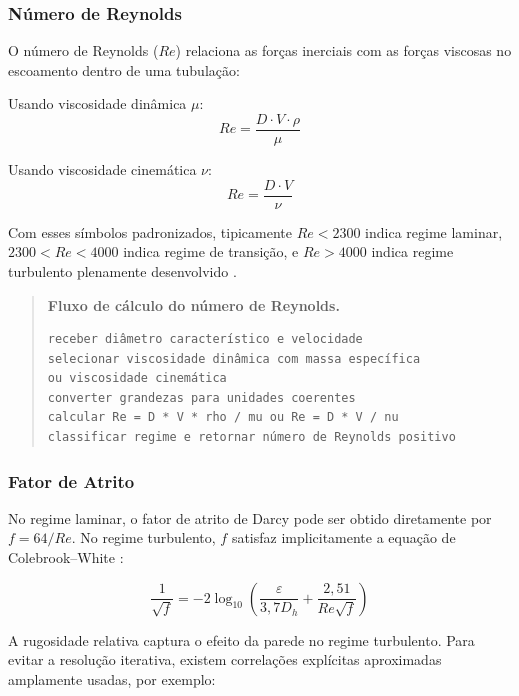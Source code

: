 \subsubsection{Número de Reynolds}

O número de Reynolds ($Re$) relaciona as forças inerciais com as forças viscosas no escoamento dentro de uma tubulação:

Usando viscosidade dinâmica $\mu$:
\begin{equation}
Re = \frac{D \cdot V \cdot \rho}{\mu}
\label{eq:reynolds_din}
\end{equation}

Usando viscosidade cinemática $\nu$:
\begin{equation}
Re = \frac{D \cdot V}{\nu}
\label{eq:reynolds_cin}
\end{equation}

Com esses símbolos padronizados, tipicamente $Re < 2300$ indica regime laminar, $2300 < Re < 4000$ indica regime de transição, e $Re > 4000$ indica regime turbulento plenamente desenvolvido \cite{white2018}.

\begin{quote}
\small
\textbf{Fluxo de cálculo do número de Reynolds.}
\begin{verbatim}
receber diâmetro característico e velocidade
selecionar viscosidade dinâmica com massa específica
ou viscosidade cinemática
converter grandezas para unidades coerentes
calcular Re = D * V * rho / mu ou Re = D * V / nu
classificar regime e retornar número de Reynolds positivo
\end{verbatim}
\end{quote}

\subsubsection{Fator de Atrito}

No regime laminar, o fator de atrito de Darcy pode ser obtido diretamente por $f = 64/Re$. No regime turbulento, $f$ satisfaz implicitamente a equação de Colebrook--White \cite{colebrook1939}:

\begin{equation}
\frac{1}{\sqrt{f}} = -2 \log_{10} \left( \frac{\varepsilon}{3{,}7D_{h}} + \frac{2{,}51}{Re\sqrt{f}} \right)
\label{eq:colebrook}
\end{equation}

A rugosidade relativa captura o efeito da parede no regime turbulento. Para evitar a resolução iterativa, existem correlações explícitas aproximadas amplamente usadas, por exemplo:

